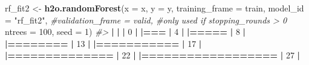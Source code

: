 \documentclass[]{book}
\newenvironment{Shaded}{\begin{snugshade}}{\end{snugshade}}
\newcommand{\CommentTok}[1]{\textcolor[rgb]{0.56,0.35,0.01}{\textit{#1}}}
\newcommand{\DataTypeTok}[1]{\textcolor[rgb]{0.13,0.29,0.53}{#1}}
\newcommand{\DecValTok}[1]{\textcolor[rgb]{0.00,0.00,0.81}{#1}}
\newcommand{\ErrorTok}[1]{\textcolor[rgb]{0.64,0.00,0.00}{\textbf{#1}}}
\newcommand{\KeywordTok}[1]{\textcolor[rgb]{0.13,0.29,0.53}{\textbf{#1}}}
\newcommand{\NormalTok}[1]{#1}
\newcommand{\OperatorTok}[1]{\textcolor[rgb]{0.81,0.36,0.00}{\textbf{#1}}}
\newcommand{\StringTok}[1]{\textcolor[rgb]{0.31,0.60,0.02}{#1}}
\begin{document}
\begin{Shaded}
\begin{Highlighting}[]
\NormalTok{rf_fit2 <-}\StringTok{ }\KeywordTok{h2o.randomForest}\NormalTok{(}\DataTypeTok{x =}\NormalTok{ x,}
                            \DataTypeTok{y =}\NormalTok{ y,}
                            \DataTypeTok{training_frame =}\NormalTok{ train,}
                            \DataTypeTok{model_id =} \StringTok{"rf_fit2"}\NormalTok{,}
                            \CommentTok{#validation_frame = valid,  #only used if stopping_rounds > 0}
                            \DataTypeTok{ntrees =} \DecValTok{100}\NormalTok{,}
                            \DataTypeTok{seed =} \DecValTok{1}\NormalTok{)}
\CommentTok{#> }
  \OperatorTok{|}\StringTok{                                                                       }
\StringTok{  }\ErrorTok{|}\StringTok{                                                                 }\ErrorTok{|}\StringTok{   }\DecValTok{0}\NormalTok{%}
  \OperatorTok{|}\StringTok{                                                                       }
\StringTok{  }\ErrorTok{|===}\StringTok{                                                              }\ErrorTok{|}\StringTok{   }\DecValTok{4}\NormalTok{%}
  \OperatorTok{|}\StringTok{                                                                       }
\StringTok{  }\ErrorTok{|=====}\StringTok{                                                            }\ErrorTok{|}\StringTok{   }\DecValTok{8}\NormalTok{%}
  \OperatorTok{|}\StringTok{                                                                       }
\StringTok{  }\ErrorTok{|========}\StringTok{                                                         }\ErrorTok{|}\StringTok{  }\DecValTok{13}\NormalTok{%}
  \OperatorTok{|}\StringTok{                                                                       }
\StringTok{  }\ErrorTok{|===========}\StringTok{                                                      }\ErrorTok{|}\StringTok{  }\DecValTok{17}\NormalTok{%}
  \OperatorTok{|}\StringTok{                                                                       }
\StringTok{  }\ErrorTok{|==============}\StringTok{                                                   }\ErrorTok{|}\StringTok{  }\DecValTok{22}\NormalTok{%}
  \OperatorTok{|}\StringTok{                                                                       }
\StringTok{  }\ErrorTok{|==================}\StringTok{                                               }\ErrorTok{|}\StringTok{  }\DecValTok{27}\NormalTok{%}
  \OperatorTok{|}\StringTok{                                                                       }
}}}}}}}
\end{Highlighting}
\end{Shaded}
\end{document}
